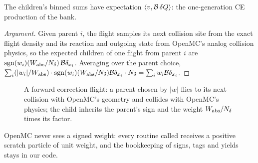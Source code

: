 \begin{proposition}
The children's binned sums have expectation $\langle v,\mathcal B\,\delta Q\rangle$: the one-generation CE
production of the bank.
\end{proposition}
\begin{proof}[Argument]
Given parent $i$, the flight samples its next collision site from the exact flight density and its
reaction and outgoing state from OpenMC's analog collision physics, so the expected children of one
flight from parent $i$ are $\mathrm{sgn}(w_i)(W_{\mathrm{abs}}/N_\delta)\,\mathcal B\delta_{x_i}$. Averaging over the parent
choice, $\sum_i(|w_i|/W_{\mathrm{abs}})\cdot\mathrm{sgn}(w_i)(W_{\mathrm{abs}}/N_\delta)\mathcal B\delta_{x_i}\cdot N_\delta
=\sum_iw_i\mathcal B\delta_{x_i}$.
\end{proof}
\begin{figure}[t]\centering
{}
\caption{A forward correction flight: a parent chosen by $|w|$ flies to its next collision with
OpenMC's geometry and collides with OpenMC's physics; the child inherits the parent's sign and the
weight $W_{\mathrm{abs}}/N_\delta$ times its factor.}\label{fig:flight}
\end{figure}

OpenMC never sees a signed weight: every routine called receives a positive scratch particle of unit
weight, and the bookkeeping of signs, tags and yields stays in our code.

